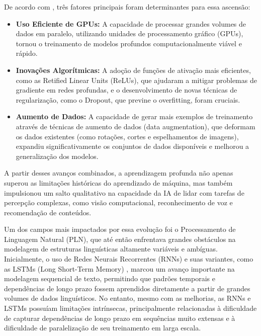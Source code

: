 De acordo com , três fatores principais foram determinantes para essa ascensão:

\begin{itemize}
    \item \textbf{Uso Eficiente de GPUs:} A capacidade de processar grandes volumes de dados em paralelo, utilizando unidades de processamento gráfico (GPUs), tornou o treinamento de modelos profundos computacionalmente viável e rápido.

    \item \textbf{Inovações Algorítmicas:} A adoção de funções de ativação mais eficientes, como as Retified Linear Units (ReLUs), que ajudaram a mitigar problemas de gradiente em redes profundas, e o desenvolvimento de novas técnicas de regularização, como o Dropout, que previne o overfitting, foram cruciais.

    \item \textbf{Aumento de Dados:} A capacidade de gerar mais exemplos de treinamento através de técnicas de aumento de dados (data augmentation), que deformam os dados existentes (como rotações, cortes e espelhamentos de imagens), expandiu significativamente os conjuntos de dados disponíveis e melhorou a generalização dos modelos.
\end{itemize}

A partir desses avanços combinados, a aprendizagem profunda não apenas superou as limitações históricas do aprendizado de máquina, mas também impulsionou um salto qualitativo na capacidade da IA de lidar com tarefas de percepção complexas, como visão computacional, reconhecimento de voz e recomendação de conteúdos.

Um dos campos mais impactados por essa evolução foi o Processamento de Linguagem Natural (PLN), que até então enfrentava grandes obstáculos na modelagem de estruturas linguísticas altamente variáveis e ambíguas. Inicialmente, o uso de Redes Neurais Recorrentes (RNNs) e suas variantes, como as LSTMs (Long Short-Term Memory) \cite{hochreiter_long_1997}, marcou um avanço importante na modelagem sequencial de texto, permitindo que padrões temporais e dependências de longo prazo fossem aprendidos diretamente a partir de grandes volumes de dados linguísticos. No entanto, mesmo com as melhorias, as RNNs e LSTMs possuíam limitações intrínsecas, principalmente relacionadas à dificuldade de capturar dependências de longo prazo em sequências muito extensas e à dificuldade de paralelização de seu treinamento em larga escala.

